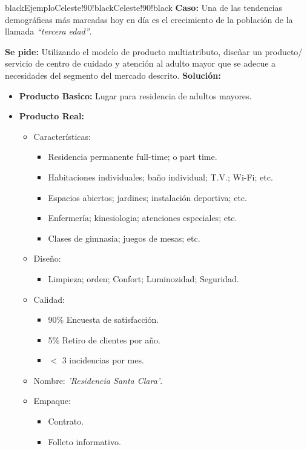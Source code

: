 \documentclass{templateNote}
\newcommand{\comillas}[1]{``#1''}
\begin{document}
\begin{CuadroPersonalizado}{black}{Ejemplo}{Celeste!90!black}{Celeste!90!black}
  \textbf{Caso:} Una de las tendencias demográficas más marcadas hoy en día es el crecimiento de la población de la llamada \textit{\comillas{tercera edad}}. 

  \textbf{Se pide:} Utilizando el modelo de producto multiatributo, diseñar un producto/ servicio de centro de cuidado y atención al adulto mayor que se adecue a necesidades del segmento del mercado descrito.
  \newline
  \textbf{Solución:}
  \begin{itemize}
    \item \textbf{Producto Basico:} Lugar para residencia de adultos mayores.
    \item \textbf{Producto Real:}
    \begin{itemize}
      \item Características:
      \begin{itemize}
        \item Residencia permanente full-time; o part time.
        \item Habitaciones individuales; baño individual; T.V.; Wi-Fi; etc.
        \item Espacios abiertos; jardines; instalación deportiva; etc.
        \item Enfermería; kinesiologia; atenciones especiales; etc.
        \item Clases de gimnasia; juegos de mesas; etc.
      \end{itemize}
      \item Diseño:
      \begin{itemize}
        \item Limpieza; orden; Confort; Luminozidad; Seguridad.
      \end{itemize}
      \item Calidad:
      \begin{itemize}
        \item 90\% Encuesta de satisfacción.
        \item 5\% Retiro de clientes por año.
        \item $ < $ 3 incidencias por mes.
      \end{itemize}
      \item Nombre: \textit{'Residencia Santa Clara'}.
      \item Empaque:
      \begin{itemize}
        \item Contrato.
        \item Folleto informativo.
      \end{itemize}
    \end{itemize}
  \end{itemize}
\end{CuadroPersonalizado}
\end{document}
